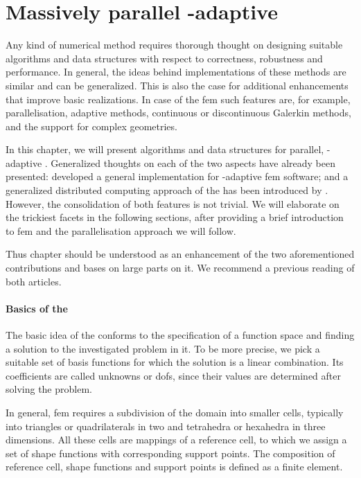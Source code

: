 \chapter{Massively parallel \hp-adaptive }
\label{ch:parallel}
\glsresetall

Any kind of numerical method requires thorough thought on designing suitable algorithms and data structures with respect to correctness, robustness and performance. In general, the ideas behind implementations of these methods are similar and can be generalized.
This is also the case for additional enhancements that improve basic realizations. In case of the \gls{fem} such features are, for example, parallelisation, adaptive methods, continuous or discontinuous Galerkin methods, and the support for complex geometries.

In this chapter, we will present algorithms and data structures for parallel, \hp-adaptive . Generalized thoughts on each of the two aspects have already been presented: \textcite{bangerth2009} developed a general implementation for \hp-adaptive \gls{fem} software; and a generalized distributed computing approach of the  has been introduced by \textcite{bangerth2012}. However, the consolidation of both features is not trivial. We will elaborate on the trickiest facets in the following sections, after providing a brief introduction to \gls{fem} and the parallelisation approach we will follow.

Thus chapter should be understood as an enhancement of the two aforementioned contributions and bases on large parts on it. We recommend a previous reading of both articles.


\subsubsection{Basics of the }

The basic idea of the  conforms to the specification of a function space and finding a solution to the investigated problem in it. To be more precise, we pick a suitable set of basis functions for which the solution is a linear combination. Its coefficients are called unknowns or \glspl{dof}, since their values are determined after solving the problem.

In general, \gls{fem} requires a subdivision of the domain into smaller cells, typically into triangles or quadrilaterals in two and tetrahedra or hexahedra in three dimensions. All these cells are mappings of a reference cell, to which we assign a set of shape functions with corresponding support points.
The composition of reference cell, shape functions and support points is defined as a finite element.

